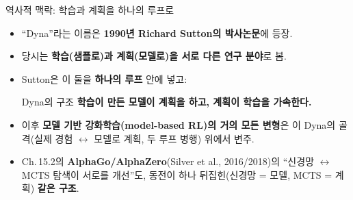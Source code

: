 \documentclass[aspectratio=169,11pt]{beamer}
\begin{document}

\begin{frame}{역사적 맥락: 학습과 계획을 하나의 루프로}
  \begin{itemize}
    \item ``Dyna''라는 이름은 \textbf{1990년 Richard Sutton의
      박사논문}에 등장.
    \item 당시는 \textbf{학습(샘플로)과 계획(모델로)을 서로 다른
      연구 분야}로 봄.
    \item Sutton은 이 둘을 \textbf{하나의 루프} 안에 넣고:
      \begin{block}{Dyna의 구조}
        \textbf{학습이 만든 모델이 계획을 하고, 계획이 학습을
        가속한다.}
      \end{block}
    \item 이후 \textbf{모델 기반 강화학습(model-based RL)의 거의
      모든 변형}은 이 Dyna의 골격(실제 경험 $\leftrightarrow$
      모델로 계획, 두 루프 병행) 위에서 변주.
    \item Ch.\,15.2의 \textbf{AlphaGo/AlphaZero}(Silver et al.,
      2016/2018)의 ``신경망 $\leftrightarrow$ MCTS 탐색이 서로를
      개선''도, 동전이 하나 뒤집힌(신경망 = 모델, MCTS = 계획)
      \textbf{같은 구조}.
  \end{itemize}
\end{frame}
\end{document}
